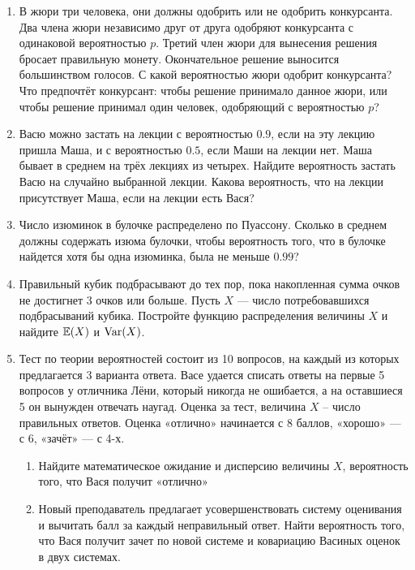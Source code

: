 \begin{enumerate}
\item В жюри три человека, они должны одобрить или не одобрить конкурсанта. Два
члена жюри независимо друг от друга одобряют конкурсанта с  одинаковой вероятностью
$p$. Третий член жюри для вынесения решения бросает правильную монету. Окончательное
решение выносится большинством голосов. С какой вероятностью жюри одобрит конкурсанта?
Что предпочтёт конкурсант: чтобы решение принимало данное жюри, или чтобы решение
принимал один человек, одобряющий с вероятностью $p$?

\item Васю можно застать на лекции с вероятностью $0.9$, если на эту лекцию пришла
Маша, и с вероятностью $0.5$, если Маши на лекции нет. Маша бывает в среднем на
трёх лекциях из четырех. Найдите вероятность застать Васю на случайно выбранной
лекции. Какова вероятность, что на лекции присутствует Маша, если на лекции есть Вася?

\item Число изюминок в булочке распределено по Пуассону. Сколько в среднем должны
содержать изюма булочки, чтобы вероятность того, что в булочке найдется хотя бы
одна изюминка, была не меньше $0.99$?

\item Правильный кубик подбрасывают до тех пор, пока накопленная сумма очков не
достигнет 3 очков или больше. Пусть $X$ — число потребовавшихся подбрасываний кубика.
Постройте функцию распределения величины $X$ и найдите $\operatorname{\mathbb{E}}(X)$ и $\operatorname{Var}(X)$.

\item Тест по теории вероятностей состоит из 10 вопросов, на каждый из которых
предлагается 3 варианта ответа. Васе удается списать ответы на первые 5 вопросов
у отличника Лёни, который никогда не ошибается, а на оставшиеся 5 он вынужден
отвечать наугад. Оценка за тест, величина $X$ – число правильных ответов. Оценка
«отлично» начинается с 8 баллов, «хорошо» — с 6, «зачёт» — с 4-х.
\begin{enumerate}
\item Найдите математическое ожидание и дисперсию величины $X$, вероятность того,
что Вася получит «отлично»
\item Новый преподаватель предлагает усовершенствовать систему оценивания и вычитать
балл за каждый неправильный ответ. Найти вероятность того, что Вася получит зачет
по новой системе и ковариацию Васиных оценок в двух системах.
\end{enumerate}


\end{enumerate}
